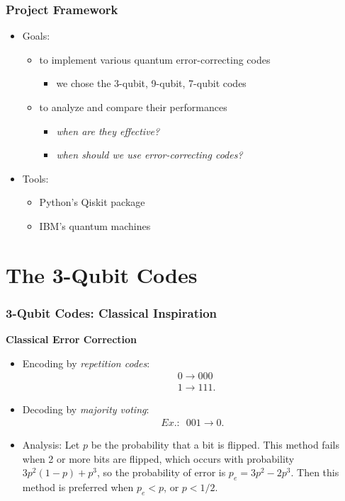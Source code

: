 \documentclass{beamer}
\begin{document}
\begin{frame}
    \frametitle{Project Framework}
    \begin{itemize}
        \item Goals: 
        \begin{itemize}
            \item to implement various quantum error-correcting codes
            \begin{itemize}
                \item we chose the 3-qubit, 9-qubit, 7-qubit codes
            \end{itemize}
            \item to analyze and compare their performances 
            \begin{itemize}
                \item \textit{when are they effective?}
                \item \textit{when should we use error-correcting codes?}
            \end{itemize} 
        \end{itemize}
        \item Tools:
        \begin{itemize}
            \item Python's Qiskit package
            \item IBM's quantum machines
        \end{itemize}
    \end{itemize}
\end{frame}

\section{The 3-Qubit Codes}
\begin{frame}
    \frametitle{3-Qubit Codes: Classical Inspiration}
    \textbf{Classical Error Correction}
    \begin{itemize}
        \item Encoding by \textit{repetition codes}:
        \begin{align*}
            &0 \rightarrow 000 \\
            &1 \rightarrow 111.
        \end{align*}
        \item Decoding by \textit{majority voting}:
        \begin{align*}
            \textit{Ex.: }\,\, 001 \rightarrow 0.
        \end{align*}
        \item Analysis: Let $p$ be the probability that a bit is flipped. This method fails when 2 or more bits are flipped, which occurs with probability $3p^2(1-p)+p^3$, so the probability of error is $p_e = 3p^2-2p^3$. Then this method is preferred when $p_e < p$, or $p < 1/2$.
    \end{itemize}
\end{frame}
\end{document}
